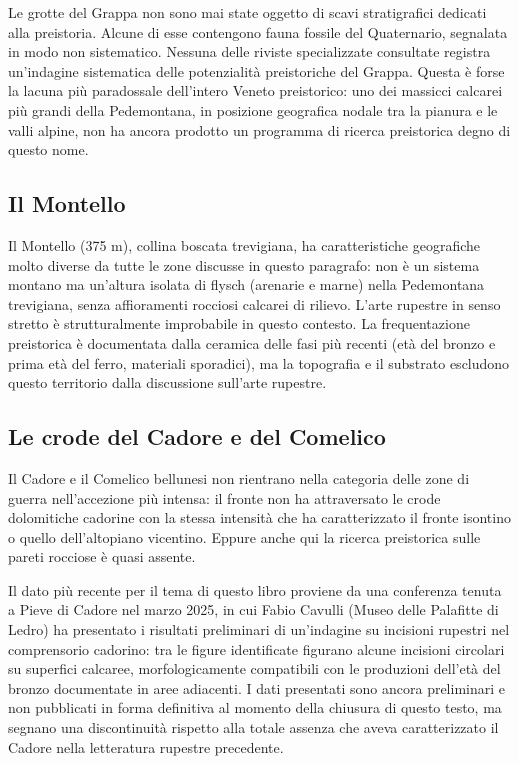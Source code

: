 Le grotte del Grappa non sono mai state oggetto di scavi stratigrafici dedicati alla preistoria. Alcune di esse contengono fauna fossile del Quaternario, segnalata in modo non sistematico. Nessuna delle riviste specializzate consultate registra un'indagine sistematica delle potenzialità preistoriche del Grappa. Questa è forse la lacuna più paradossale dell'intero Veneto preistorico: uno dei massicci calcarei più grandi della Pedemontana, in posizione geografica nodale tra la pianura e le valli alpine, non ha ancora prodotto un programma di ricerca preistorica degno di questo nome.

\subsection{Il Montello}

Il Montello (375 m), collina boscata trevigiana, ha caratteristiche geografiche molto diverse da tutte le zone discusse in questo paragrafo: non è un sistema montano ma un'altura isolata di flysch (arenarie e marne) nella Pedemontana trevigiana, senza affioramenti rocciosi calcarei di rilievo. L'arte rupestre in senso stretto è strutturalmente improbabile in questo contesto. La frequentazione preistorica è documentata dalla ceramica delle fasi più recenti (età del bronzo e prima età del ferro, materiali sporadici), ma la topografia e il substrato escludono questo territorio dalla discussione sull'arte rupestre.

\subsection{Le crode del Cadore e del Comelico}

Il Cadore e il Comelico bellunesi non rientrano nella categoria delle zone di guerra nell'accezione più intensa: il fronte non ha attraversato le crode dolomitiche cadorine con la stessa intensità che ha caratterizzato il fronte isontino o quello dell'altopiano vicentino. Eppure anche qui la ricerca preistorica sulle pareti rocciose è quasi assente.

Il dato più recente per il tema di questo libro proviene da una conferenza tenuta a Pieve di Cadore nel marzo 2025, in cui Fabio Cavulli (Museo delle Palafitte di Ledro) ha presentato i risultati preliminari di un'indagine su incisioni rupestri nel comprensorio cadorino: tra le figure identificate figurano alcune incisioni circolari su superfici calcaree, morfologicamente compatibili con le produzioni dell'età del bronzo documentate in aree adiacenti. I dati presentati sono ancora preliminari e non pubblicati in forma definitiva al momento della chiusura di questo testo, ma segnano una discontinuità rispetto alla totale assenza che aveva caratterizzato il Cadore nella letteratura rupestre precedente.

